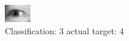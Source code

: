 \begin{figure}[h!]
\begin{center}
\includegraphics[width=0.60\columnwidth]{figures/ID3128_class_3_target_4.png}
\end{center}
\caption{ Classification: 3 actual target: 4}
\label{fig:ID3128_class_3_target_4}
\end{figure}
